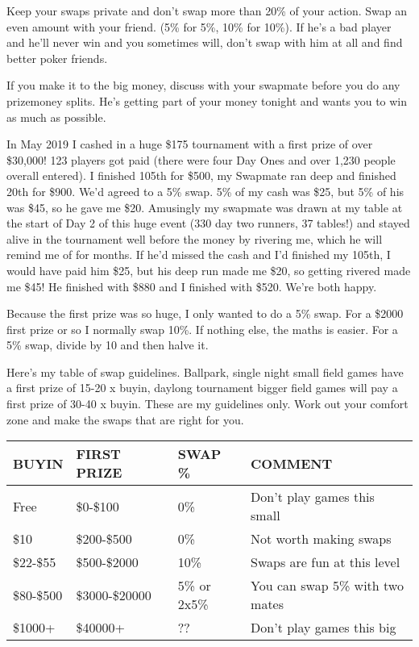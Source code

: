 Keep your swaps private and don't swap more than 20\% of your action.
Swap an even amount with your friend. (5\% for 5\%, 10\% for 10\%).
If he's a bad player and he'll never win and you sometimes will, don't
swap with him at all and find better poker friends.

If you make it to the big money, discuss with your swapmate before you
do any prizemoney splits. He's getting part of your money tonight and
wants you to win as much as possible.

In May 2019 I cashed in a huge \$175 tournament with a first
prize of over \$30,000! 123 players got paid (there were four Day Ones
and over 1,230 people overall entered). I finished 105th for \$500, my
Swapmate ran deep and finished 20th for \$900. We'd agreed to a 5\% swap.
5\% of my cash was \$25, but 5\% of his was \$45, so he gave me \$20.
Amusingly my swapmate was drawn at my table at the start of Day 2 of
this huge event (330 day two runners, 37 tables!) and stayed alive in
the tournament well before the money by rivering me, which he will
remind me of for months. If he'd missed the cash and I'd finished my
105th, I would have paid him \$25, but his deep run made me \$20, so
getting rivered made me \$45! He finished with \$880 and I
finished with \$520. We're both happy.

Because the first prize was so huge, I only wanted to do a 5\% swap.
For a \$2000 first prize or so I normally swap 10\%. If nothing else,
the maths is easier. For a 5\% swap, divide by 10 and then halve it.

Here's my table of swap guidelines. Ballpark, single night small field
games have a first prize of 15-20 x buyin, daylong tournament bigger
field games will pay a first prize of 30-40 x buyin.
These are my guidelines only. Work out your comfort zone and make the
swaps that are right for you.

\begin{tabular}{|l|l|l|l|} \hline
BUYIN & FIRST PRIZE & SWAP \% & COMMENT\\ \hline
Free  & \$0-\$100 & 0\% & Don't play games this small \\ \hline
\$10  & \$200-\$500 & 0\%  & Not worth making swaps \\ \hline
\$22-\$55 & \$500-\$2000 & 10\% & Swaps are fun at this level \\ \hline
\$80-\$500 & \$3000-\$20000 & 5\% or 2x5\% & You can swap 5\% with two mates \\ \hline
\$1000+ & \$40000+ & ?? & Don't play games this big \\ \hline
\end{tabular}

